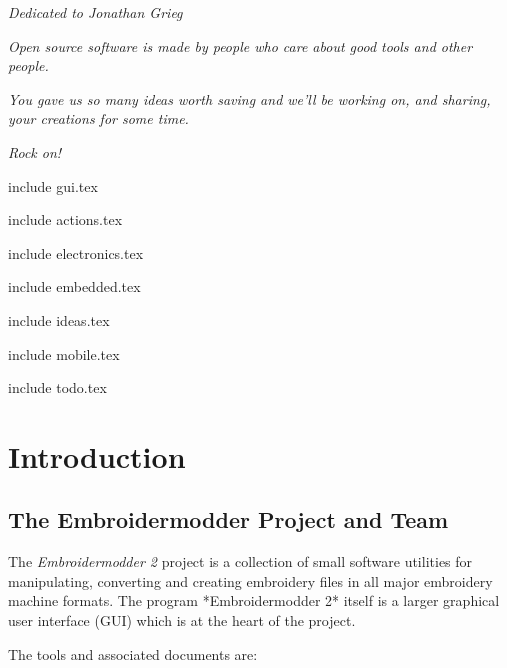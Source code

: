 \documentclass[a4paper]{report}
\begin{document}
\newpage

\vspace*{8cm}

\begin{center}
    \emph{Dedicated to Jonathan Grieg}
    
    \vspace{1cm}
    
    \emph{Open source software is made by people who care about good tools
     and other people.}
    
    \vspace{1cm}
    
    \emph{You gave us so many ideas worth saving and we'll be working on,
    and sharing, your creations for some time.}
    
    \vspace{1cm}
    
    \emph{Rock on!}
\end{center}
    
\newpage

\tableofcontents

include gui.tex

include actions.tex
	
include electronics.tex

include embedded.tex
		
include ideas.tex

include mobile.tex

include todo.tex

\chapter{Introduction}

\section{The Embroidermodder Project and Team}

The \emph{Embroidermodder 2} project is a collection of small software
utilities for manipulating, converting and creating embroidery files in all
major embroidery machine formats. The program *Embroidermodder 2* itself
is a larger graphical user interface (GUI) which is at the heart of the project.

The tools and associated documents are:
\end{document}
